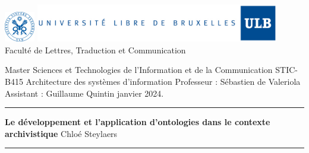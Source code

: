 \documentclass[12pt]{report}
\begin{document}
    \begin{titlepage}
        \begin{center}
        \includegraphics[width=0.1\textwidth, margin= 0 -1.5cm 0 0]{l.jpg}
        \includegraphics[width=0.8\textwidth]{u.jpg}
        \vspace{0.5cm}
      \newline Faculté de Lettres, Traduction et Communication
     \end{center}
     \vspace*{1cm}
     Master Sciences et Technologies de l'Information et de la Communication
     \newline STIC-B415  Architecture des systèmes d'information 
       \vspace*{0,5cm}
        \newline Professeur : Sébastien de Valeriola
        \newline Assistant : Guillaume Quintin
      janvier 2024.
      \vspace*{0,5cm}
     \newline \rule{11cm}{0,02cm}
     \vspace*{1,5cm}
     \newline \textbf{{\Large Le développement et l'application d'ontologies dans le contexte archivistique}}
       \vspace*{0,5cm}
     \vspace*{1cm}
     \newline Chloé Steylaers
     \vspace*{1,5cm}
     \newline \rule{4cm}{0,02cm}
\end{titlepage}
\end{document}
